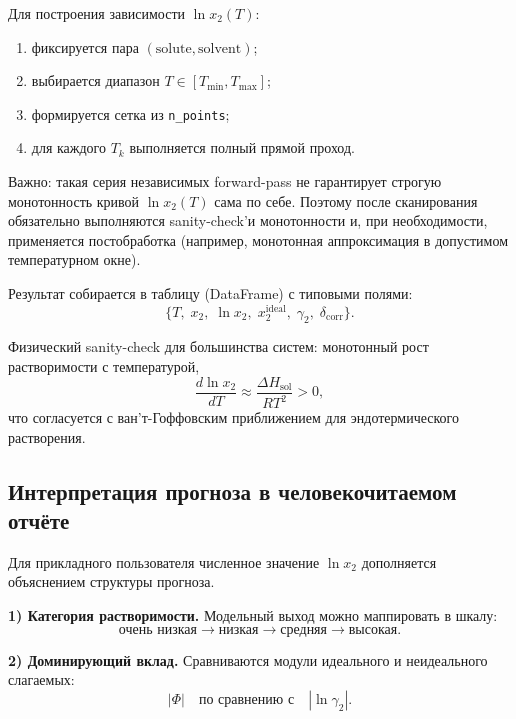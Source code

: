 \documentclass[11pt]{article}
\begin{document}
Для построения зависимости $\ln x_2(T)$:
\begin{enumerate}
  \item фиксируется пара $(\mathrm{solute},\mathrm{solvent})$;
  \item выбирается диапазон $T\in[T_{\min},T_{\max}]$;
  \item формируется сетка из \texttt{n\_points};
  \item для каждого $T_k$ выполняется полный прямой проход.
\end{enumerate}

Важно: такая серия независимых forward-pass не гарантирует строгую монотонность кривой $\ln x_2(T)$ сама по себе. Поэтому после сканирования обязательно выполняются sanity-check'и монотонности и, при необходимости, применяется постобработка (например, монотонная аппроксимация в допустимом температурном окне).

Результат собирается в таблицу (DataFrame) с типовыми полями:
\begin{equation*}
\{T,\; x_2,\; \ln x_2,\; x_2^{\mathrm{ideal}},\; \gamma_2,\; \delta_{\mathrm{corr}}\}.
\end{equation*}

Физический sanity-check для большинства систем: монотонный рост растворимости с температурой,
\begin{equation*}
\frac{d\ln x_2}{dT} \approx \frac{\Delta H_{\mathrm{sol}}}{RT^2} > 0,
\end{equation*}
что согласуется с ван'т-Гоффовским приближением для эндотермического растворения.

\subsection{Интерпретация прогноза в человекочитаемом отчёте}

Для прикладного пользователя численное значение $\ln x_2$ дополняется объяснением структуры прогноза.

\textbf{1) Категория растворимости.}
Модельный выход можно маппировать в шкалу:
\begin{equation*}
\text{очень низкая} \rightarrow \text{низкая} \rightarrow \text{средняя} \rightarrow \text{высокая}.
\end{equation*}

\textbf{2) Доминирующий вклад.}
Сравниваются модули идеального и неидеального слагаемых:
\begin{equation*}
|\Phi| \quad \text{по сравнению с} \quad |\ln\gamma_2|.
\end{equation*}
\end{document}
